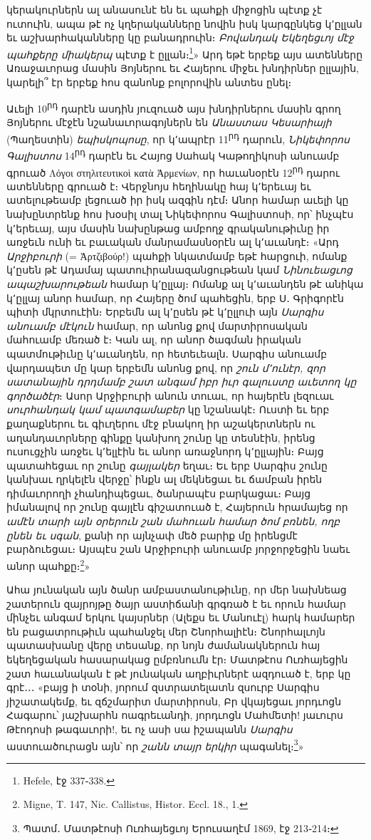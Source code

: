\documentclass{article}
\begin{document}
{կերակուրներն ալ անասունէ են եւ պահքի միջոցին պէտք չէ ուտուին, ապա թէ ոչ կղերականները նովին իսկ կարգընկեց կ՚ըլլան եւ աշխարհականները կը բանադրուին։ \emph{Բովանդակ Եկեղեցւոյ մէջ պահքերը միակերպ} պէտք է ըլլան։\footnote{Hefele, էջ 337֊338.}» Արդ եթէ երբեք այս ատենները Առաջաւորաց մասին Յոյներու եւ Հայերու միջեւ խնդիրներ ըլլային, կարելի՞ էր երբեք հոս զանոնք բոլորովին անտես ընել։

Աւելի 10\textsuperscript{րդ} դարէն ասդին յուզուած այս խնդիրներու մասին գրող Յոյներու մէջէն նշանաւորագոյներն են \emph{Անաստաս Կեսարիայի} (Պաղեստին) \emph{եպիսկոպոսը}, որ կ՚ապրէր 11\textsuperscript{րդ} դարուն, \emph{Նիկեփորոս Գալիստոս} 14\textsuperscript{րդ} դարէն եւ Հայոց Սահակ Կաթողիկոսի անուամբ գրուած Λόγοι στηλιτευτικοὶ κατὰ Ἀρμενίων, որ հաւանօրէն 12\textsuperscript{րդ} դարու ատենները գրուած է։ Վերջնոյս հեղինակը հայ կ՚երեւայ եւ ատելութեամբ լեցուած իր իսկ ազգին դէմ։ Անոր համար աւելի կը նախընտրենք հոս խօսիլ տալ Նիկեփորոս Գալիստոսի, որ՝ ինչպէս կ՚երեւայ, այս մասին նախընթաց ամբողջ գրականութիւնը իր առջեւն ունի եւ բաւական մանրամասնօրէն ալ կ՚աւանդէ։ «Արդ \emph{Արջիբուրի} (= Ἀρτζιβούρ!) պահքի նկատմամբ եթէ հարցուի, ոմանք կ՚ըսեն թէ Ադամայ պատուիրանազանցութեան կամ \emph{Նինուեացւոց ապաշխարութեան} համար կ՚ըլլայ։ Ոմանք ալ կ՚աւանդեն թէ անիկա կ՚ըլլայ անոր համար, որ Հայերը ծոմ պահեցին, երբ Ս․ Գրիգորէն պիտի մկրտուէին։ Երբեմն ալ կ՚ըսեն թէ կ՚ըլլուի այն \emph{Սարգիս անուամբ մէկուն} համար, որ անոնց քով մարտիրոսական մահուամբ մեռած է։ Կան ալ, որ անոր ծագման իրական պատմութիւնը կ՚աւանդեն, որ հետեւեալն․ Սարգիս անուամբ վարդապետ մը կար երբեմն անոնց քով, որ \emph{շուն մ՚ունէր, զոր սատանային դրդմամբ շատ անգամ իբր իւր գալուստը աւետող կը գործածէր}։ Ասոր Արջիբուրի անուն տուաւ, որ հայերէն լեզուաւ \emph{սուրհանդակ կամ պատգամաբեր} կը նշանակէ։ Ուստի եւ երբ քաղաքներու եւ գիւղերու մէջ բնակող իր աշակերտներն ու աղանդաւորները գինքը կանխող շունը կը տեսնէին, իրենց ուսուցչին առջեւ կ՚ելլէին եւ անոր առաջնորդ կ՚ըլլային։ Բայց պատահեցաւ որ շունը \emph{գայլակեր} եղաւ։ Եւ երբ Սարգիս շունը կանխաւ ղրկելէն վերջը՝ ինքն ալ մեկնեցաւ եւ ճամբան իրեն դիմաւորողի չհանդիպեցաւ, ծանրապէս բարկացաւ։ Բայց իմանալով որ շունը գայլէն գիշատուած է, Հայերուն հրամայեց որ \emph{ամէն տարի այն օրերուն շան մահուան համար ծոմ բռնեն, ողբ ընեն եւ սգան}, քանի որ այնչափ մեծ բարիք մը իրենցմէ բարձուեցաւ։ Այսպէս շան Արջիբուրի անուամբ յորջորջեցին նաեւ անոր պահքը։\footnote{Migne, T. 147, Nic. Callistus, Histor. Eccl. 18., 1.}»

Ահա յունական այն ծանր ամբաստանութիւնը, որ մեր նախնեաց շատերուն զայրոյթը ծայր աստիճանի գրգռած է եւ որուն համար մինչեւ անգամ երկու կայսրներ (Ալեքս եւ Մանուէլ) հարկ համարեր են բացատրութիւն պահանջել մեր Շնորհալիէն։ Շնորհալւոյն պատասխանը վերը տեսանք, որ նոյն ժամանակներուն հայ եկեղեցական հասարակաց ըմբռնումն էր։ Մատթէոս Ուռհայեցին շատ հաւանական է թէ յունական աղբիւրներէ ազդուած է, երբ կը գրէ․․․ «բայց ի տօնի, յորում զստրատելատն զսուրբ Սարգիս յիշատակեմք, եւ զճշմարիտ մարտիրոսն, Բր վկայեցաւ յորդւոցն Հագարու՝ յաշխարհն ոագրեւանդի, յորդւոցն Մահմետի! յաւուրս Թէոդոսի թագաւորի!, եւ ոչ ասի սա իշապանն \emph{Սարգիս} աստուածուրացն այն՝ որ \emph{շանն տայր երկիր} պագանել։\footnote{Պատմ․ Մատթէոսի Ուռհայեցւոյ Երուսաղէմ 1869, էջ 213֊214։}»

}
\end{document}
